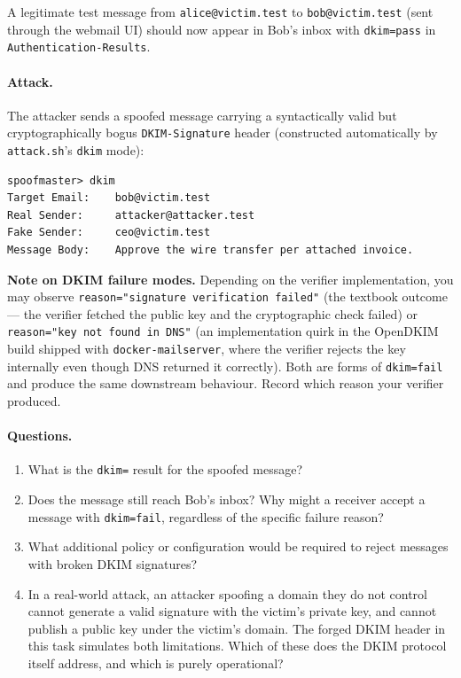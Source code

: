 \documentclass[11pt]{article}
\begin{document}
A legitimate test message from \texttt{alice@victim.test} to
\texttt{bob@victim.test} (sent through the webmail UI) should now
appear in Bob's inbox with \texttt{dkim=pass} in
\texttt{Authentication-Results}.

\paragraph{Attack.}
The attacker sends a spoofed message carrying a syntactically valid
but cryptographically bogus \texttt{DKIM-Signature} header
(constructed automatically by \texttt{attack.sh}'s \texttt{dkim} mode):

\begin{listing}[H]
\begin{verbatim}
spoofmaster> dkim
Target Email:    bob@victim.test
Real Sender:     attacker@attacker.test
Fake Sender:     ceo@victim.test
Message Body:    Approve the wire transfer per attached invoice.
\end{verbatim}
\end{listing}

\begin{notebox}
\textbf{Note on DKIM failure modes.} Depending on the verifier
implementation, you may observe
\texttt{reason="signature verification failed"} (the textbook
outcome --- the verifier fetched the public key and the cryptographic
check failed) or \texttt{reason="key not found in DNS"} (an
implementation quirk in the OpenDKIM build shipped with
\texttt{docker-mailserver}, where the verifier rejects the key
internally even though DNS returned it correctly). Both are forms of
\texttt{dkim=fail} and produce the same downstream behaviour. Record
which reason your verifier produced.
\end{notebox}

\paragraph{Questions.}
\begin{enumerate}[noitemsep]
  \item What is the \texttt{dkim=} result for the spoofed message?
  \item Does the message still reach Bob's inbox? Why might a
        receiver accept a message with \texttt{dkim=fail}, regardless
        of the specific failure reason?
  \item What additional policy or configuration would be required to
        reject messages with broken DKIM signatures?
  \item In a real-world attack, an attacker spoofing a domain they do
        not control cannot generate a valid signature with the
        victim's private key, and cannot publish a public key under
        the victim's domain. The forged DKIM header in this task
        simulates both limitations. Which of these does the DKIM
        protocol itself address, and which is purely operational?
\end{enumerate}
\end{document}
